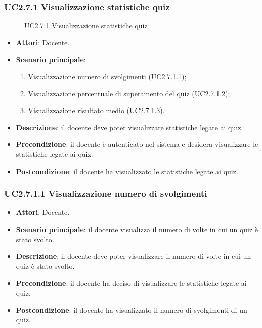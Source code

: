 \subsubsection{UC2.7.1 Visualizzazione statistiche quiz}
\begin{figure}[H]
\centering
\noindent{}
\caption{UC2.7.1 Visualizzazione statistiche quiz}
\end{figure}
\begin{itemize}
\item \textbf{Attori}: Docente.
\item \textbf{Scenario principale}:
\begin{enumerate}
\item Visualizzazione numero di svolgimenti (UC2.7.1.1);
\item Visualizzazione percentuale di superamento del quiz (UC2.7.1.2);
\item Visualizzazione risultato medio (UC2.7.1.3).
\end{enumerate}
\item \textbf{Descrizione}: il docente deve poter visualizzare statistiche legate ai quiz.
\item \textbf{Precondizione}: il docente è autenticato nel sistema e desidera visualizzare le statistiche legate ai quiz.
\item \textbf{Postcondizione}: il docente ha visualizzato le statistiche legate ai quiz.
\end{itemize}
\subsubsection{UC2.7.1.1 Visualizzazione numero di svolgimenti}
\begin{itemize}
\item \textbf{Attori}: Docente.
\item \textbf{Scenario principale}: il docente visualizza il numero di volte in cui un quiz è stato svolto.
\item \textbf{Descrizione}: il docente deve poter visualizzare il numero di volte in cui un quiz è stato svolto.
\item \textbf{Precondizione}: il docente ha deciso di visualizzare le statistiche legate ai quiz.
\item \textbf{Postcondizione}: il docente ha visualizzato il numero di svolgimenti di un quiz.
\end{itemize}
